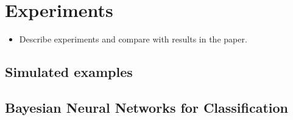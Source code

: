 
\section{Experiments}

\begin{itemize}
    \item Describe experiments and compare with results in the paper.
\end{itemize}

\subsection{Simulated examples}

\subsection{Bayesian Neural Networks for Classification}